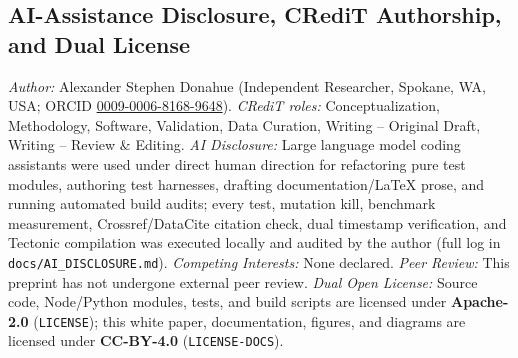 \documentclass[11pt,reqno]{amsart}
\theoremstyle{definition}
\newcommand{\code}[1]{{\footnotesize\nolinkurl{#1}}}
\begin{document}
\subsection{AI-Assistance Disclosure, CRediT Authorship, and Dual License}
\emph{Author:} Alexander Stephen Donahue (Independent Researcher, Spokane, WA, USA; ORCID \href{https://orcid.org/0009-0006-8168-9648}{0009-0006-8168-9648}). \emph{CRediT roles:} Conceptualization, Methodology, Software, Validation, Data Curation, Writing -- Original Draft, Writing -- Review \& Editing. \emph{AI Disclosure:} Large language model coding assistants were used under direct human direction for refactoring pure test modules, authoring test harnesses, drafting documentation/LaTeX prose, and running automated build audits; every test, mutation kill, benchmark measurement, Crossref/DataCite citation check, dual timestamp verification, and Tectonic compilation was executed locally and audited by the author (full log in \code{docs/AI\_DISCLOSURE.md}). \emph{Competing Interests:} None declared. \emph{Peer Review:} This preprint has not undergone external peer review. \emph{Dual Open License:} Source code, Node/Python modules, tests, and build scripts are licensed under \textbf{Apache-2.0} (\code{LICENSE}); this white paper, documentation, figures, and diagrams are licensed under \textbf{CC-BY-4.0} (\code{LICENSE-DOCS}).

\FloatBarrier


\end{document}
